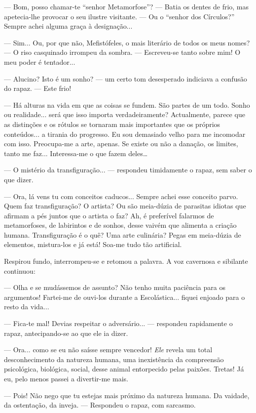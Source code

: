 --- Bom, posso chamar-te ``senhor Metamorfose''? ---  Batia os dentes de frio,
mas apetecia-lhe provocar o seu ilustre visitante. --- Ou o ``senhor dos
Círculos?'' Sempre achei alguma graça à designação...

--- Sim... Ou, por que não, Mefistófeles, o mais literário de todos os
meus nomes? --- O riso casquinado irrompeu da sombra. --- Escreveu-se tanto
sobre mim! O meu poder é tentador...

--- Alucino? Isto é um sonho? --- um certo tom desesperado indiciava a
confusão do rapaz. --- Este frio!

--- Há alturas na vida em que as coisas se fundem. São partes de um todo.
Sonho ou realidade... será que isso importa verdadeiramente?
Actualmente, parece que as distinções e os rótulos se tornaram mais
importantes que os próprios conteúdos... a tirania do progresso. Eu sou
demasiado velho para me incomodar com isso. Preocupa-me a arte, apenas.
Se existe ou não a danação, os limites, tanto me faz... Interessa-me o
que fazem deles\ldots{}

--- O mistério da transfiguração... --- respondeu timidamente o rapaz, sem
saber o que dizer.

--- Ora, lá vens tu com conceitos caducos... Sempre achei esse conceito
parvo. Quem faz transfiguração? O artista? Ou são meia-dúzia de
parasitas idiotas que afirmam a pés juntos que o artista o faz? Ah, é
preferível falarmos de metamorfoses, de labirintos e de sonhos, desse
vaivém que alimenta a criação humana. Transfiguração é o quê? Uma arte
culinária? Pegas em meia-dúzia de elementos, mistura-los e já está!
Soa-me tudo tão artificial.

Respirou fundo, interrompeu-se e retomou a palavra. A voz cavernosa e
sibilante continuou:

--- Olha e se mudássemos de assunto? Não tenho muita paciência para os
argumentos! Fartei-me de ouvi-los durante a Escolástica... fiquei
enjoado para o resto da vida...

--- Fica-te mal! Devias respeitar o adversário... --- respondeu rapidamente
o rapaz, antecipando-se ao que ele ia dizer.

--- Ora... como se eu não saísse sempre vencedor! \emph{Ele} revela um
total desconhecimento da natureza humana, uma inexistência da
compreensão psicológica, biológica, social, desse animal entorpecido
pelas paixões. Tretas! Já eu, pelo menos passei a divertir-me mais.

--- Pois! Não nego que tu estejas mais próximo da natureza humana. Da
vaidade, da ostentação, da inveja. --- Respondeu o rapaz, com sarcasmo.

